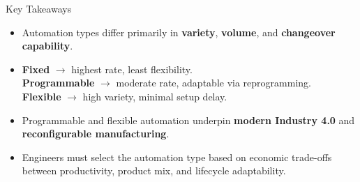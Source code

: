 \begin{frame}{Key Takeaways}
\begin{itemize}
  \item Automation types differ primarily in \textbf{variety}, \textbf{volume}, and \textbf{changeover capability}.
  \item \textbf{Fixed} $\rightarrow$ highest rate, least flexibility.\\
        \textbf{Programmable} $\rightarrow$ moderate rate, adaptable via reprogramming.\\
        \textbf{Flexible} $\rightarrow$ high variety, minimal setup delay.
  \item Programmable and flexible automation underpin \textbf{modern Industry 4.0} and \textbf{reconfigurable manufacturing}.
  \item Engineers must select the automation type based on economic trade-offs between productivity, product mix, and lifecycle adaptability.
\end{itemize}
\end{frame}

